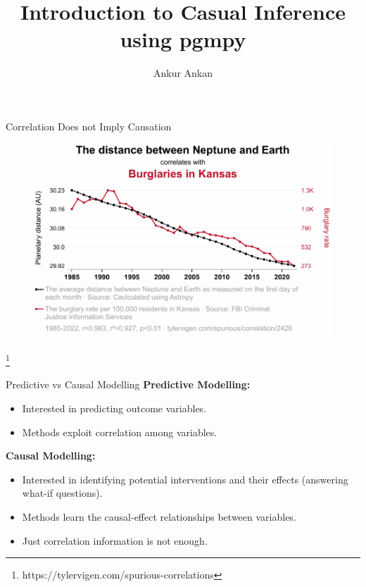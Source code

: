 \documentclass[aspectratio=169]{beamer}
\title[Causal Inference using pgmpy]{Introduction to Casual Inference using pgmpy}
\author{Ankur Ankan}
\institute[]{Postdoctoral Researcher \\ Radboud University, The Netherlands}
\date{}
\newcommand\blfootnote[1]{
    \begingroup
    \renewcommand\thefootnote{}\footnote{#1}
    \addtocounter{footnote}{-1}
    \endgroup
}
\begin{document}
\begin{frame}
	\maketitle
\end{frame}

\begin{frame}{Correlation Does not Imply Causation}
	\begin{figure}
		\center
		\includegraphics[scale=0.63]{imgs/spurious1.pdf}
	\end{figure}
	\blfootnote{https://tylervigen.com/spurious-correlations}
\end{frame}

\begin{frame}{Predictive vs Causal Modelling}
	\textbf{Predictive Modelling:}
		\begin{itemize}
			\item Interested in predicting outcome variables.
			\item Methods exploit correlation among variables.
		\end{itemize}
	\vspace{2em}
	\textbf{Causal Modelling:}
		\begin{itemize}
			\item Interested in identifying potential interventions and their effects (answering what-if questions).
			\item Methods learn the causal-effect relationships between variables.
			\item Just correlation information is not enough.
		\end{itemize}
\end{frame}
\end{document}
